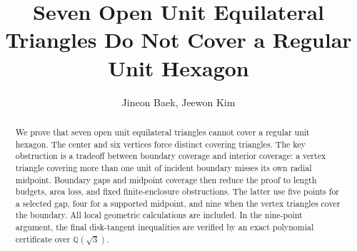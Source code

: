 \documentclass{amsart}
\title[Seven triangles do not cover the unit hexagon]
{Seven Open Unit Equilateral Triangles Do Not Cover a Regular Unit Hexagon}
\author{Jineon Baek, Jeewon Kim}
\theoremstyle{definition}
\theoremstyle{remark}
\begin{document}
\raggedbottom
\setcounter{secnumdepth}{3}

\begin{abstract}
We prove that seven open unit equilateral triangles cannot cover a regular
unit hexagon. The center and six vertices force distinct covering triangles.
The key obstruction is a tradeoff between boundary coverage and interior
coverage: a vertex triangle covering more than one unit of incident boundary
misses its own radial midpoint. Boundary gaps and midpoint coverage then
reduce the proof to length budgets, area loss, and fixed finite-enclosure
obstructions. The latter use five points for a selected gap, four for a
supported midpoint, and nine when the vertex triangles cover the boundary.
All local geometric calculations are included. In the nine-point argument,
the final disk-tangent inequalities are verified by an exact polynomial
certificate over $\mathbb Q(\sqrt3)$.
\end{abstract}

\maketitle
\setcounter{tocdepth}{1}
\tableofcontents







\label{page:proof-body-end}

\clearpage
\appendix






\end{document}
